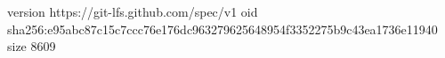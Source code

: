 version https://git-lfs.github.com/spec/v1
oid sha256:e95abc87c15c7ccc76e176dc963279625648954f3352275b9c43ea1736e11940
size 8609
